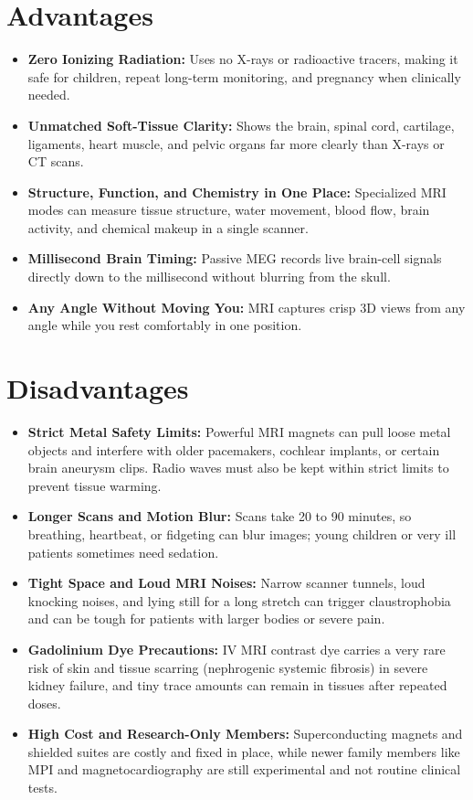 \section{Advantages}
\begin{itemize}
  \item \textbf{Zero Ionizing Radiation:} Uses no X-rays or radioactive tracers, making it safe for children, repeat long-term monitoring, and pregnancy when clinically needed.
  \item \textbf{Unmatched Soft-Tissue Clarity:} Shows the brain, spinal cord, cartilage, ligaments, heart muscle, and pelvic organs far more clearly than X-rays or CT scans.
  \item \textbf{Structure, Function, and Chemistry in One Place:} Specialized MRI modes can measure tissue structure, water movement, blood flow, brain activity, and chemical makeup in a single scanner.
  \item \textbf{Millisecond Brain Timing:} Passive MEG records live brain-cell signals directly down to the millisecond without blurring from the skull.
  \item \textbf{Any Angle Without Moving You:} MRI captures crisp 3D views from any angle while you rest comfortably in one position.
\end{itemize}

\section{Disadvantages}
\begin{itemize}
  \item \textbf{Strict Metal Safety Limits:} Powerful MRI magnets can pull loose metal objects and interfere with older pacemakers, cochlear implants, or certain brain aneurysm clips. Radio waves must also be kept within strict limits to prevent tissue warming.
  \item \textbf{Longer Scans and Motion Blur:} Scans take 20 to 90 minutes, so breathing, heartbeat, or fidgeting can blur images; young children or very ill patients sometimes need sedation.
  \item \textbf{Tight Space and Loud MRI Noises:} Narrow scanner tunnels, loud knocking noises, and lying still for a long stretch can trigger claustrophobia and can be tough for patients with larger bodies or severe pain.
  \item \textbf{Gadolinium Dye Precautions:} IV MRI contrast dye carries a very rare risk of skin and tissue scarring (nephrogenic systemic fibrosis) in severe kidney failure, and tiny trace amounts can remain in tissues after repeated doses.
  \item \textbf{High Cost and Research-Only Members:} Superconducting magnets and shielded suites are costly and fixed in place, while newer family members like MPI and magnetocardiography are still experimental and not routine clinical tests.
\end{itemize}

